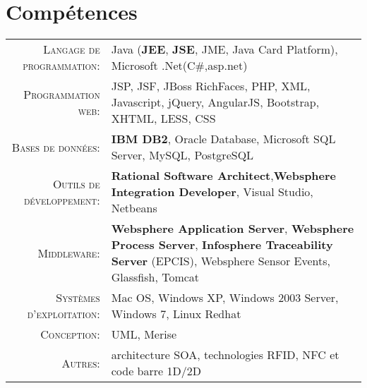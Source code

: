 \section{\texorpdfstring{\color{Blue}Compétences}{Compétences}}
\renewcommand{\arraystretch}{1.2}
\begin{tabular}{rp{13cm}} 
	\textsc{Langage de programmation:}			& Java (\textbf{JEE}, \textbf{JSE}, JME, Java Card Platform), Microsoft .Net(C\#,asp.net)\\ 
	\textsc{Programmation web:}      & JSP, JSF, JBoss RichFaces, PHP, XML, Javascript, jQuery, AngularJS, Bootstrap, XHTML, LESS, CSS\\ 
	\textsc{Bases de données:}		& \textbf{IBM DB2}, Oracle Database, Microsoft SQL Server, MySQL, PostgreSQL \\ 
	\textsc{Outils de développement:}	& \textbf{Rational Software Architect},\textbf{Websphere Integration Developer}, Visual Studio, Netbeans\\
	\textsc{Middleware:}				& \textbf{Websphere Application Server}, \textbf{Websphere Process Server}, \textbf{Infosphere Traceability Server} (EPCIS), Websphere Sensor Events, 							Glassfish, Tomcat\\ 
	\textsc{Systèmes d'exploitation:}	& Mac OS, Windows XP, Windows 2003 Server, Windows 7, Linux Redhat\\ 
	\textsc{Conception:}				& UML, Merise\\
	\textsc{Autres:}					& architecture SOA, technologies RFID, NFC et code barre 1D/2D
\end{tabular}